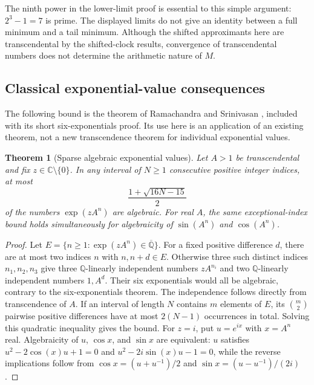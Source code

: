 \documentclass[11pt,a4paper]{article}
\newtheorem{theorem}{Theorem}[section]
\theoremstyle{definition}\newtheorem{definition}[theorem]{Definition}
\theoremstyle{remark}\newtheorem{remark}[theorem]{Remark}
\begin{document}
The ninth power in the lower-limit proof is essential to this simple
argument: $2^3-1=7$ is prime. The displayed limits do not give an
identity between a full minimum and a tail minimum. Although the
shifted approximants here are transcendental by the shifted-clock
results, convergence of transcendental numbers does not determine the
arithmetic nature of $M$.

\subsection{Classical exponential-value consequences}
\label{sec:init-exponentials}

The following bound is the theorem of Ramachandra and Srinivasan
\cite{RamachandraSrinivasan1983}, included with its short
six-exponentials proof. Its use here is an application of an existing
theorem, not a new transcendence theorem for individual exponential
values.

\begin{theorem}[Sparse algebraic exponential values]
\label{init:six-exponentials}
Let $A>1$ be transcendental and fix $z\in\mathbb C\setminus\{0\}$.
In any interval of $N\ge1$ consecutive positive integer indices,
at most
\[
 \frac{1+\sqrt{16N-15}}2
\]
of the numbers $\exp(zA^n)$ are algebraic.
For real $A$, the same exceptional-index bound holds simultaneously
for algebraicity of $\sin(A^n)$ and $\cos(A^n)$.
\end{theorem}
\begin{proof}
Let $E=\{n\ge1:\exp(zA^n)\in\overline{\mathbb Q}\}$.
For a fixed positive difference $d$, there are at most two indices
$n$ with $n,n+d\in E$. Otherwise three such distinct indices
$n_1,n_2,n_3$ give three $\mathbb Q$-linearly independent numbers
$zA^{n_i}$ and two $\mathbb Q$-linearly independent numbers $1,A^d$.
Their six exponentials would all be algebraic, contrary to the
six-exponentials theorem. The independence follows directly from
transcendence of $A$.
If an interval of length $N$ contains $m$ elements of $E$, its
$\binom m2$ pairwise positive differences have at most $2(N-1)$
occurrences in total. Solving this quadratic inequality gives the bound.
For $z=i$, put $u=e^{ix}$ with $x=A^n$ real.
Algebraicity of $u$, $\cos x$, and $\sin x$ are equivalent:
$u$ satisfies $u^2-2\cos(x)u+1=0$ and
$u^2-2i\sin(x)u-1=0$, while the reverse implications follow from
$\cos x=(u+u^{-1})/2$ and $\sin x=(u-u^{-1})/(2i)$.
\end{proof}
\end{document}
